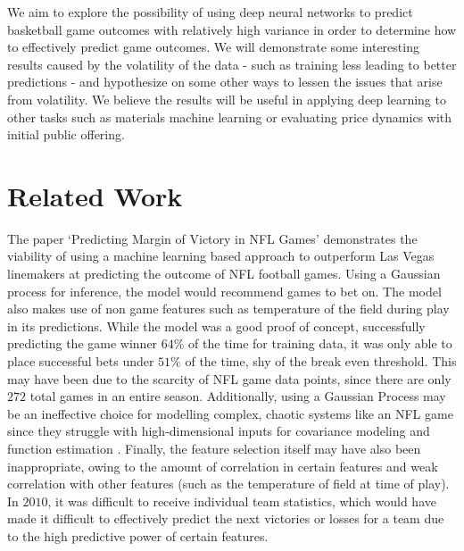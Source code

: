 \documentclass[10pt,twocolumn,letterpaper]{article}
\begin{document}
We aim to explore the possibility of using deep neural networks to predict basketball game outcomes with relatively high variance in order to determine how to effectively predict game outcomes. We will demonstrate some interesting results caused by the volatility of the data - such as training less leading to better predictions - and hypothesize on some other ways to lessen the issues that arise from volatility. We believe the results will be useful in applying deep learning to other tasks such as materials machine learning or evaluating price dynamics with initial public offering. \\


\section{Related Work}

The paper `Predicting Margin of Victory in NFL Games' \cite{Warner} demonstrates the viability of using a machine learning based approach to outperform Las Vegas linemakers at predicting the outcome of NFL football games. Using a Gaussian process for inference, the model would recommend games to bet on. The model also makes use of non game features such as temperature of the field during play in its predictions. While the model was a good proof of concept, successfully predicting the game winner $64\%$ of the time for training data, it was only able to place successful bets under $51\%$ of the time, shy of the break even threshold. This may have been due to the scarcity of NFL game data points, since there are only $272$ total games in an entire season. Additionally, using a Gaussian Process may be an ineffective choice for modelling complex, chaotic systems like an NFL game since they struggle with high-dimensional inputs for covariance modeling and function estimation \cite{GP}. Finally, the feature selection itself may have also been inappropriate, owing to the amount of correlation in certain features and weak correlation with other features (such as the temperature of field at time of play). In $2010$, it was difficult to receive individual team statistics, which would have made it difficult to effectively predict the next victories or losses for a team due to the high predictive power of certain features. \\
\end{document}

